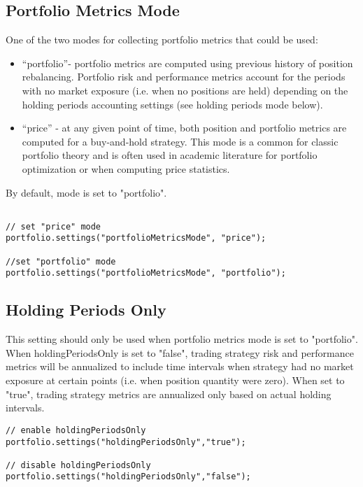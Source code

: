 \documentclass[letterpaper]{report}
\begin{document}
\subsection {Portfolio Metrics Mode}
One of the two modes for collecting portfolio metrics that could be used:
  \begin{itemize} 					
\item ``portfolio''- portfolio metrics are computed using previous history of position rebalancing.
Portfolio risk and performance metrics account for the periods with no
market exposure (i.e. when no positions are held) depending on the
holding periods accounting settings (see holding periods mode below).
\item ``price'' -    at any given point of time, both position and portfolio
metrics are computed for a buy-and-hold strategy. 
This mode is a common for classic portfolio theory and is often used in
academic literature for portfolio optimization or when computing price
statistics.
\end{itemize}
By default, mode is set to "portfolio".
\begin{lstlisting}

// set "price" mode
portfolio.settings("portfolioMetricsMode", "price");

//set "portfolio" mode
portfolio.settings("portfolioMetricsMode", "portfolio");
\end{lstlisting}

\subsection {Holding Periods Only}
This setting should only be used when portfolio metrics mode is set to "portfolio".
When holdingPeriodsOnly is set to "false", trading strategy risk and performance
metrics will be annualized to include time intervals when strategy had no market exposure at certain points (i.e. when position quantity were zero).
When set to "true", trading strategy metrics are annualized only based on actual holding intervals.

\begin{lstlisting}
// enable holdingPeriodsOnly
portfolio.settings("holdingPeriodsOnly","true");

// disable holdingPeriodsOnly
portfolio.settings("holdingPeriodsOnly","false");

\end{lstlisting}
\end{document}
